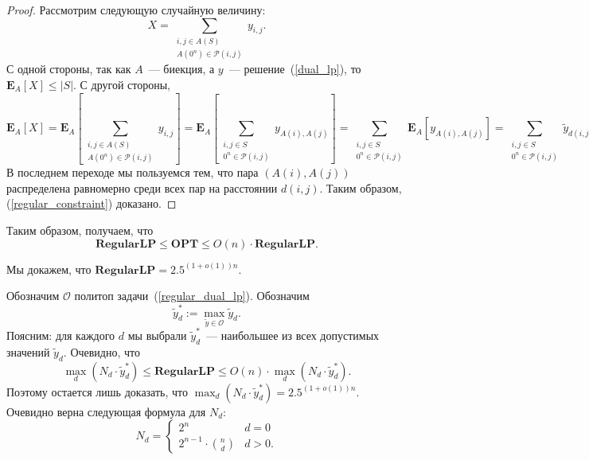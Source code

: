 \documentclass[12pt]{article}
\newcommand{\abs}[1]{\left|#1\right|}
\newcommand{\Oc}{\mathcal{O}}
\newcommand{\Pc}{\mathcal{P}}
\newcommand{\Exp}[2]{\mathbf{E}_{#1}\left[#2\right]}
\begin{document}
\begin{proof}
        Рассмотрим следующую случайную величину:
        $$
            X = \sum_{\begin{smallmatrix}
                i, j \in A(S) \\
                A(0^n) \in \Pc(i, j)
            \end{smallmatrix}} y_{i,j}.
        $$
        С одной стороны, так как $A$~--- биекция, а $y$~--- решение~(\ref{dual_lp}),
        то $\Exp{A}{X} \leq \abs{S}$.
        С другой стороны,
        $$
            \Exp{A}{X} = \Exp{A}{
            \sum_{\begin{smallmatrix}
                i, j \in A(S) \\
                A(0^n) \in \Pc(i, j)
            \end{smallmatrix}} y_{i,j}
            } =  \Exp{A}{
            \sum_{\begin{smallmatrix}
                i, j \in S \\
                0^n \in \Pc(i, j)
            \end{smallmatrix}} y_{A(i),A(j)}
            } = \sum_{\begin{smallmatrix}i, j \in S \\
                0^n \in \Pc(i, j)\end{smallmatrix}} \Exp{A}{y_{A(i),A(j)}} = 
                \sum_{\begin{smallmatrix}i,j \in S \\ 0^n \in \Pc(i, j)
                    \end{smallmatrix}} \tilde{y}_{d(i,j)}.
        $$
        В последнем переходе мы пользуемся тем, что пара $(A(i), A(j))$
        распределена равномерно среди всех пар на расстоянии $d(i, j)$.
        Таким образом, (\ref{regular_constraint}) доказано.
    \end{proof}

    Таким образом, получаем, что
    $$
        \mathbf{RegularLP} \leq \mathbf{OPT} \leq O(n) \cdot \mathbf{RegularLP}.
    $$

    Мы докажем, что $\mathbf{RegularLP} = 2.5^{(1+o(1))n}$.

    Обозначим $\Oc$ политоп задачи~(\ref{regular_dual_lp}).
    Обозначим 
    $$
        \tilde{y}_d^* := \max_{\tilde{y} \in \Oc} \tilde{y}_d.
    $$
    Поясним: для каждого $d$ мы выбрали $\tilde{y}_d^*$~--- наибольшее из всех допустимых значений $\tilde{y}_d$.  Очевидно, что
    $$
        \max_d (N_d \cdot \tilde{y}_d^*) \leq \mathbf{RegularLP} \leq O(n) \cdot \max_d (N_d \cdot \tilde{y}_d^*).
    $$
    Поэтому остается лишь доказать, что $\max_d (N_d \cdot \tilde{y}_d^*) = 2.5^{(1 + o(1)) n}$.
    Очевидно верна следующая формула для $N_d$:
    $$
        N_d = \begin{cases}
            2^n & d = 0 \\
            2^{n-1} \cdot \binom{n}{d} & d > 0.
        \end{cases}
    $$
\end{document}
